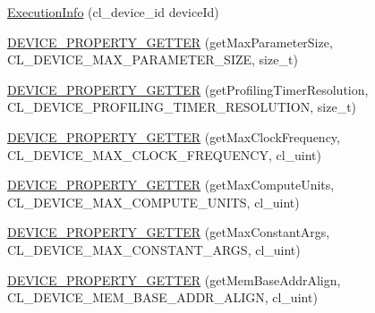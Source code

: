\begin{DoxyCompactItemize}
\item 
\hyperlink{class_c_l_ray_tracer_1_1_open_c_l_utils_1_1_c_l_device_1_1_execution_info_a8b180abf92896a1d249b9596881a97b9}{Execution\+Info} (cl\+\_\+device\+\_\+id device\+Id)
\item 
\hyperlink{class_c_l_ray_tracer_1_1_open_c_l_utils_1_1_c_l_device_1_1_execution_info_a4151b2470b4e44ce9c2526c2c3a94f95}{D\+E\+V\+I\+C\+E\+\_\+\+P\+R\+O\+P\+E\+R\+T\+Y\+\_\+\+G\+E\+T\+T\+ER} (get\+Max\+Parameter\+Size, C\+L\+\_\+\+D\+E\+V\+I\+C\+E\+\_\+\+M\+A\+X\+\_\+\+P\+A\+R\+A\+M\+E\+T\+E\+R\+\_\+\+S\+I\+ZE, size\+\_\+t)
\item 
\hyperlink{class_c_l_ray_tracer_1_1_open_c_l_utils_1_1_c_l_device_1_1_execution_info_a61ccac3726f090580c18895ec508c499}{D\+E\+V\+I\+C\+E\+\_\+\+P\+R\+O\+P\+E\+R\+T\+Y\+\_\+\+G\+E\+T\+T\+ER} (get\+Profiling\+Timer\+Resolution, C\+L\+\_\+\+D\+E\+V\+I\+C\+E\+\_\+\+P\+R\+O\+F\+I\+L\+I\+N\+G\+\_\+\+T\+I\+M\+E\+R\+\_\+\+R\+E\+S\+O\+L\+U\+T\+I\+ON, size\+\_\+t)
\item 
\hyperlink{class_c_l_ray_tracer_1_1_open_c_l_utils_1_1_c_l_device_1_1_execution_info_af68dd449ebc085c4ecfc3d51a7f6ef63}{D\+E\+V\+I\+C\+E\+\_\+\+P\+R\+O\+P\+E\+R\+T\+Y\+\_\+\+G\+E\+T\+T\+ER} (get\+Max\+Clock\+Frequency, C\+L\+\_\+\+D\+E\+V\+I\+C\+E\+\_\+\+M\+A\+X\+\_\+\+C\+L\+O\+C\+K\+\_\+\+F\+R\+E\+Q\+U\+E\+N\+CY, cl\+\_\+uint)
\item 
\hyperlink{class_c_l_ray_tracer_1_1_open_c_l_utils_1_1_c_l_device_1_1_execution_info_ab43b721775b5e30d81c6d74981b7379a}{D\+E\+V\+I\+C\+E\+\_\+\+P\+R\+O\+P\+E\+R\+T\+Y\+\_\+\+G\+E\+T\+T\+ER} (get\+Max\+Compute\+Units, C\+L\+\_\+\+D\+E\+V\+I\+C\+E\+\_\+\+M\+A\+X\+\_\+\+C\+O\+M\+P\+U\+T\+E\+\_\+\+U\+N\+I\+TS, cl\+\_\+uint)
\item 
\hyperlink{class_c_l_ray_tracer_1_1_open_c_l_utils_1_1_c_l_device_1_1_execution_info_a4488367d64bd92f4057e270bfaac0b6c}{D\+E\+V\+I\+C\+E\+\_\+\+P\+R\+O\+P\+E\+R\+T\+Y\+\_\+\+G\+E\+T\+T\+ER} (get\+Max\+Constant\+Args, C\+L\+\_\+\+D\+E\+V\+I\+C\+E\+\_\+\+M\+A\+X\+\_\+\+C\+O\+N\+S\+T\+A\+N\+T\+\_\+\+A\+R\+GS, cl\+\_\+uint)
\item 
\hyperlink{class_c_l_ray_tracer_1_1_open_c_l_utils_1_1_c_l_device_1_1_execution_info_aa7faa21a7c6595c17b41e4ac4d55d1b4}{D\+E\+V\+I\+C\+E\+\_\+\+P\+R\+O\+P\+E\+R\+T\+Y\+\_\+\+G\+E\+T\+T\+ER} (get\+Mem\+Base\+Addr\+Align, C\+L\+\_\+\+D\+E\+V\+I\+C\+E\+\_\+\+M\+E\+M\+\_\+\+B\+A\+S\+E\+\_\+\+A\+D\+D\+R\+\_\+\+A\+L\+I\+GN, cl\+\_\+uint)
\item 

\end{DoxyCompactItemize}
